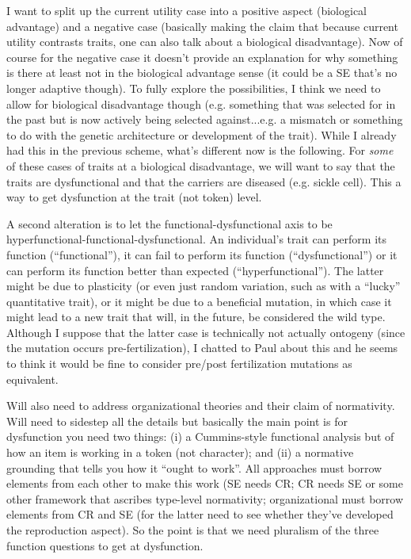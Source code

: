 \documentclass{article}
\begin{document}
I want to split up the current utility case into a positive aspect (biological advantage) and a negative case (basically making the claim that because current utility contrasts traits, one can also talk about a biological disadvantage). Now of course for the negative case it doesn't provide an explanation for why something is there at least not in the biological advantage sense (it could be a SE that's no longer adaptive though). To fully explore the possibilities, I think we need to allow for biological disadvantage though (e.g. something that was selected for in the past but is now actively being selected against...e.g. a mismatch or something to do with the genetic architecture or development of the trait). While I already had this in the previous scheme, what's different now is the following. For \emph{some} of these cases of traits at a biological disadvantage, we will want to say that the traits are dysfunctional and that the carriers are diseased (e.g. sickle cell). This a way to get dysfunction at the trait (not token) level.

A second alteration is to let the functional-dysfunctional axis to be hyperfunctional-functional-dysfunctional. An individual's trait can perform its function (``functional''), it can fail to perform its function (``dysfunctional'') or it can perform its function better than expected (``hyperfunctional''). The latter might be due to plasticity (or even just random variation, such as with a ``lucky'' quantitative trait), or it might be due to a beneficial mutation, in which case it might lead to a new trait that will, in the future, be considered the wild type. Although I suppose that the latter case is technically not actually ontogeny (since the mutation occurs pre-fertilization), I chatted to Paul about this and he seems to think it would be fine to consider pre/post fertilization mutations as equivalent.

Will also need to address organizational theories and their claim of normativity. Will need to sidestep all the details but basically the main point is for dysfunction you need two things: (i) a Cummins-style functional analysis but of how an item is working in a token (not character); and (ii) a normative grounding that tells you how it ``ought to work''. All approaches must borrow elements from each other to make this work (SE needs CR; CR needs SE or some other framework that ascribes type-level normativity; organizational must borrow elements from CR and SE (for the latter need to see whether they've developed the reproduction aspect). So the point is that we need pluralism of the three function questions to get at dysfunction.
\end{document}
